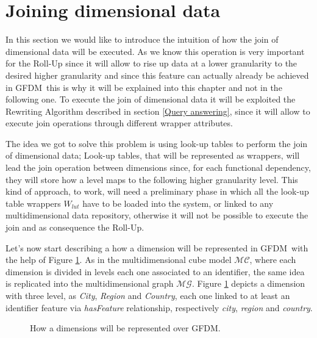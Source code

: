 \documentclass[12pt,a4paper]{report}
\newcommand\systemName{GFDM}
\newcommand\lut{W_{lut}}
\newcommand\multidimensionalCube{\mathcal{MC}}
\newcommand\multidimensionalGraph{\mathcal{MG}}
\begin{document}
\section{Joining dimensional data} \label{Joining dimensional data}
In this section we would like to introduce the intuition of how the join of dimensional data will be executed.
%
As we know this operation is very important for the Roll-Up since it will allow to rise up data at a lower granularity to the desired higher granularity and since this feature can actually already be achieved in \systemName\, this is why it will be explained into this chapter and not in the following one.
%
To execute the join of dimensional data it will be exploited the Rewriting Algorithm described in section \ref{Query answering}, since it will allow to execute join operations through different wrapper attributes.

The idea we got to solve this problem is using look-up tables to perform the join of dimensional data;
%
Look-up tables, that will be represented as wrappers, will lead the join operation between dimensions since, for each functional dependency, they will store how a level maps to the following higher granularity level.
%
This kind of approach, to work, will need a preliminary phase in which all the look-up table wrappers $\lut$ have to be loaded into the system, or linked to any multidimensional data repository, otherwise it will not be possible to execute the join and as consequence the Roll-Up.

Let's now start describing a how a dimension will be represented in \systemName\, with the help of Figure \ref{fig:Dimension}.
%
As in the multidimensional cube model $\multidimensionalCube$, where each dimension is divided in levels each one associated to an identifier, the same idea is replicated into the multidimensional graph $\multidimensionalGraph$.
%
Figure \ref{fig:Dimension} depicts a dimension with three level, as \textit{City}, \textit{Region} and \textit{Country}, each one linked to at least an identifier feature via \textit{hasFeature} relationship, respectively \textit{city}, \textit{region} and \textit{country}.
%
\begin{figure} [ht]
    \caption{How a dimensions will be represented over \systemName.}
    \label{fig:Dimension}
\end{figure}
\end{document}
